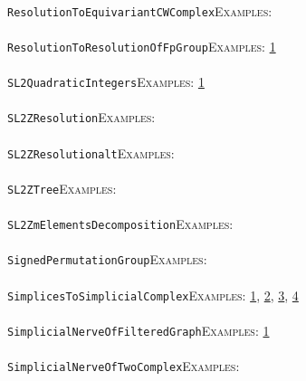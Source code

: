 \documentclass[a4paper,11pt]{report}
\begin{document}
{{ \\
 \texttt{ResolutionToEquivariantCWComplex}{\nobreakspace}{\nobreakspace}{\nobreakspace}{\nobreakspace}\textsc{Examples:} \\
 \\
 \texttt{ResolutionToResolutionOfFpGroup}{\nobreakspace}{\nobreakspace}{\nobreakspace}{\nobreakspace}\textsc{Examples:} \href{../www/SideLinks/About/aboutArithmetic.html} {1}{\nobreakspace} \\
 \\
 \texttt{SL2QuadraticIntegers}{\nobreakspace}{\nobreakspace}{\nobreakspace}{\nobreakspace}\textsc{Examples:} \href{tutorial/chap10.html} {1}{\nobreakspace} \\
 \\
 \texttt{SL2ZResolution}{\nobreakspace}{\nobreakspace}{\nobreakspace}{\nobreakspace}\textsc{Examples:} \\
 \\
 \texttt{SL2ZResolution{\textunderscore}alt}{\nobreakspace}{\nobreakspace}{\nobreakspace}{\nobreakspace}\textsc{Examples:} \\
 \\
 \texttt{SL2ZTree}{\nobreakspace}{\nobreakspace}{\nobreakspace}{\nobreakspace}\textsc{Examples:} \\
 \\
 \texttt{SL2ZmElementsDecomposition}{\nobreakspace}{\nobreakspace}{\nobreakspace}{\nobreakspace}\textsc{Examples:} \\
 \\
 \texttt{SignedPermutationGroup}{\nobreakspace}{\nobreakspace}{\nobreakspace}{\nobreakspace}\textsc{Examples:} \\
 \\
 \texttt{SimplicesToSimplicialComplex}{\nobreakspace}{\nobreakspace}{\nobreakspace}{\nobreakspace}\textsc{Examples:} \href{tutorial/chap3.html} {1}{\nobreakspace}, \href{../www/SideLinks/About/aboutCoveringSpaces.html} {2}{\nobreakspace}, \href{../www/SideLinks/About/aboutCoverinSpaces.html} {3}{\nobreakspace}, \href{../www/SideLinks/About/aboutCubical.html} {4}{\nobreakspace} \\
 \\
 \texttt{SimplicialNerveOfFilteredGraph}{\nobreakspace}{\nobreakspace}{\nobreakspace}{\nobreakspace}\textsc{Examples:} \href{../www/SideLinks/About/aboutPersistent.html} {1}{\nobreakspace} \\
 \\
 \texttt{SimplicialNerveOfTwoComplex}{\nobreakspace}{\nobreakspace}{\nobreakspace}{\nobreakspace}\textsc{Examples:} \\
}}
\end{document}
